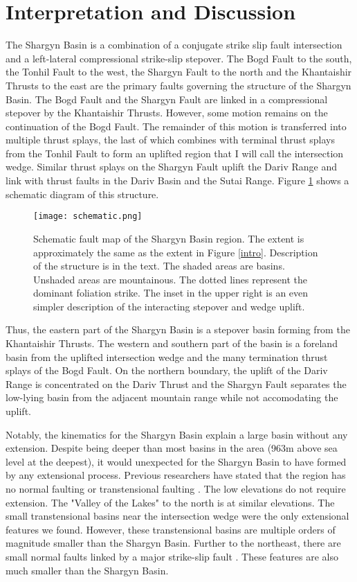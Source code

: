 \section{Interpretation and Discussion}
	The Shargyn Basin is a combination of a conjugate strike slip fault intersection and a left-lateral compressional strike-slip stepover. The Bogd Fault to the south, the Tonhil Fault to the west, the Shargyn Fault to the north and the Khantaishir Thrusts to the east are the primary faults governing the structure of the Shargyn Basin. The Bogd Fault and the Shargyn Fault are linked in a compressional stepover by the Khantaishir Thrusts. However, some motion remains on the continuation of the Bogd Fault. The remainder of this motion is transferred into multiple thrust splays, the last of which combines with terminal thrust splays from the Tonhil Fault to form an uplifted region that I will call the intersection wedge. Similar thrust splays on the Shargyn Fault uplift the Dariv Range and link with thrust faults in the Dariv Basin and the Sutai Range. Figure \ref{schematic} shows a schematic diagram of this structure.

\begin{figure}[h!]
  \centering
  \texttt{[image: schematic.png]}
  \caption{Schematic fault map of the Shargyn Basin region. The extent is approximately the same as the extent in Figure \ref{intro}. Description of the structure is in the text. The shaded areas are basins. Unshaded areas are mountainous. The dotted lines represent the dominant foliation strike. The inset in the upper right is an even simpler description of the interacting stepover and wedge uplift.}
  \label{schematic}
\end{figure}

	Thus, the eastern part of the Shargyn Basin is a stepover basin forming from the Khantaishir Thrusts. The western and southern part of the basin is a foreland basin from the uplifted intersection wedge and the many termination thrust splays of the Bogd Fault. On the northern boundary, the uplift of the Dariv Range is concentrated on the Dariv Thrust and the Shargyn Fault separates the low-lying basin from the adjacent mountain range while not accomodating the uplift.

	Notably, the kinematics for the Shargyn Basin explain a large basin without any extension. Despite being deeper than most basins in the area (963m above sea level at the deepest), it would unexpected for the Shargyn Basin to have formed by any extensional process. Previous researchers have stated that the region has no normal faulting or transtensional faulting \citep{Cunningham2005a}. The low elevations do not require extension. The "Valley of the Lakes" to the north is at similar elevations. The small transtensional basins near the intersection wedge were the only extensional features we found. However, these transtensional basins are multiple orders of magnitude smaller than the Shargyn Basin. Further to the northeast, there are small normal faults linked by a major strike-slip fault \citep{Walker2006}. These features are also much smaller than the Shargyn Basin.


